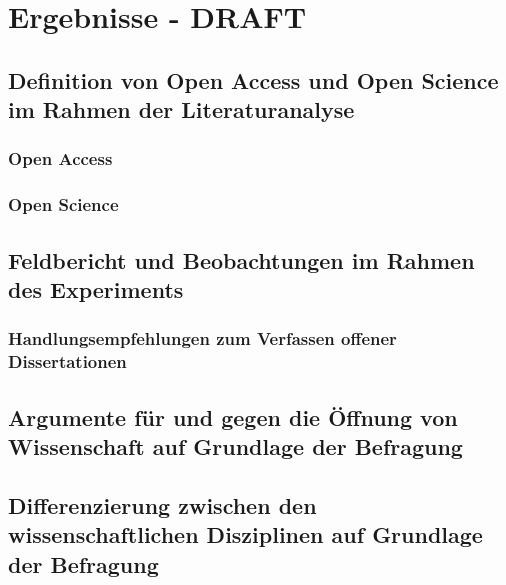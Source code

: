 \chapter{Ergebnisse - DRAFT}

\section{Definition von Open Access und Open Science im Rahmen der Literaturanalyse}
\subsection{Open Access}
\subsection{Open Science}
\section{Feldbericht und Beobachtungen im Rahmen des Experiments}
\subsection{Handlungsempfehlungen zum Verfassen offener Dissertationen}
\section{Argumente für und gegen die Öffnung von Wissenschaft auf Grundlage der Befragung}
\section{Differenzierung zwischen den wissenschaftlichen Disziplinen auf Grundlage der Befragung}